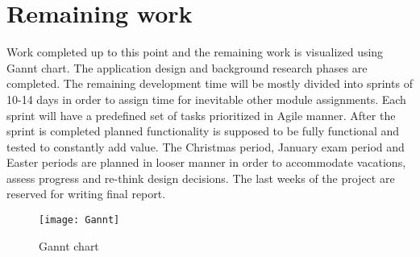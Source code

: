 \section{Remaining work}

Work completed up to this point and the remaining work is visualized using Gannt chart. The application design and background research phases are completed. The remaining development time will be mostly divided into sprints of 10-14 days in order to assign time for inevitable other module assignments. Each sprint will have a predefined set of tasks prioritized in Agile manner. After the sprint is completed planned functionality is supposed to be fully functional and tested to constantly add value. The Christmas period, January exam period and Easter periods are planned in looser manner in order to accommodate vacations, assess progress and re-think design decisions. The last weeks of the project are reserved for writing final report.

\begin{figure}
\caption{Gannt chart}
\texttt{[image: Gannt]}
\centering
\end{figure}